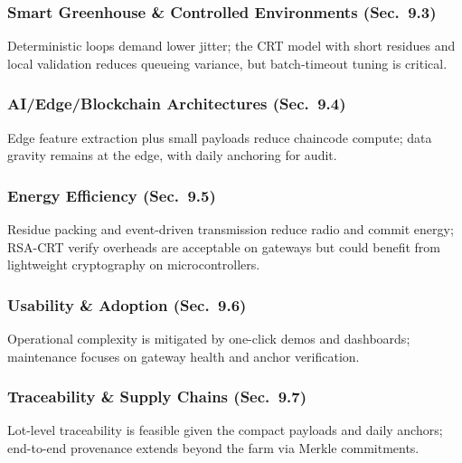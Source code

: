 \subsubsection{Smart Greenhouse \& Controlled Environments (Sec.~9.3)}
Deterministic loops demand lower jitter; the CRT model with short residues and local validation reduces queueing variance, but batch-timeout tuning is critical.

\subsubsection{AI/Edge/Blockchain Architectures (Sec.~9.4)}
Edge feature extraction plus small payloads reduce chaincode compute; data gravity remains at the edge, with daily anchoring for audit.

\subsubsection{Energy Efficiency (Sec.~9.5)}
Residue packing and event-driven transmission reduce radio and commit energy; RSA-CRT verify overheads are acceptable on gateways but could benefit from lightweight cryptography on microcontrollers.

\subsubsection{Usability \& Adoption (Sec.~9.6)}
Operational complexity is mitigated by one-click demos and dashboards; maintenance focuses on gateway health and anchor verification.

\subsubsection{Traceability \& Supply Chains (Sec.~9.7)}
Lot-level traceability is feasible given the compact payloads and daily anchors; end-to-end provenance extends beyond the farm via Merkle commitments.

